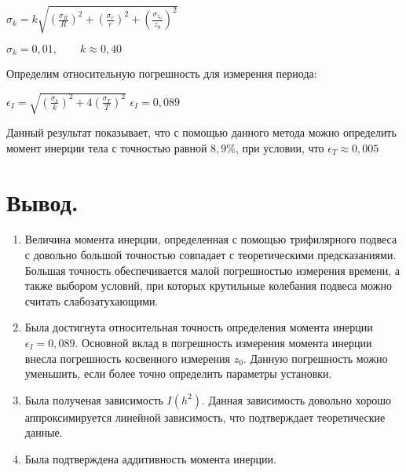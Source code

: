 \documentclass[12pt,a4paper]{article}
\begin{document}
		\begin{flushleft}
			\begin{spacing}{1.6}
				$ \sigma_{k} = k\sqrt{\left(\frac{\sigma_{R}}{R}\right)^2 + \left(\frac{\sigma_{r}}{r}\right)^2 + \left(\frac{\sigma_{z_{0}}}{z_{0}}\right)^2} $
			
				$ \sigma_{k} = 0,01,\qquad k \approx 0,40$
			\end{spacing} 
		\end{flushleft}
		
		Определим относительную погрешность для измерения периода:
		\begin{flushleft}
			\begin{spacing}{1.6}
				$ \epsilon_{I} = \sqrt{\left(\frac{\sigma_{k}}{k}\right)^2 + 4\left(\frac{\sigma_{T}}{T}\right)^2} $
				$ \epsilon_{I} = 0,089 $
			\end{spacing} 
		\end{flushleft}
		 
		 Данный результат показывает, что с помощью данного метода можно определить момент инерции тела с точностью равной  $8,9\%$, при условии, что $\epsilon_{T} \approx 0,005$
		 
		\newpage		 
		 
\section{Вывод.}
	\begin{enumerate}
		\item Величина момента инерции, определенная с помощью трифилярного подвеса с довольно большой точностью совпадает с теоретическими предсказаниями. Большая точность обеспечивается малой погрешностью измерения времени, а также выбором условий, при которых крутильные колебания подвеса можно считать слабозатухающими.
		\item Была достигнута относительная точность определения момента инерции $ \epsilon_{I} = 0,089 $. Основной вклад в погрешность измерения момента инерции внесла погрешность косвенного измерения $z_{0}$. Данную погрешность можно уменьшить, если более точно определить параметры установки.
		\item Была полученая зависимость $ I(h^{2}) $. Данная зависимость довольно хорошо аппроксимируется линейной зависимость, что подтверждает теоретические данные.
		\item Была подтверждена аддитивность момента инерции.
	\end{enumerate}
\end{document}

